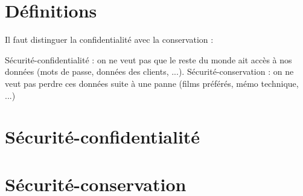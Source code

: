 
\section{Définitions}
%

	Il faut distinguer la confidentialité avec la conservation : 

		Sécurité-confidentialité : on ne veut pas que le reste du monde ait accès à nos données (mots de passe, données des clients, ...).
		Sécurité-conservation : on ne veut pas perdre ces données suite à une panne (films préférés, mémo technique, ...)


\section{Sécurité-confidentialité}




\section{Sécurité-conservation}


